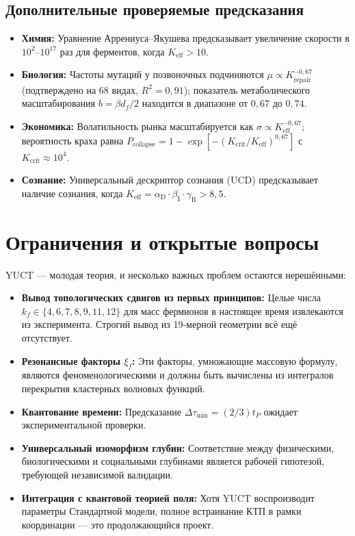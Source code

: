 \documentclass[11pt]{article}
\theoremstyle{remark}
\newcommand{\Keff}{K_{\mathrm{eff}}}
\newcommand{\alD}{\alpha_{\mathrm{D}}}
\newcommand{\beI}{\beta_{\mathrm{I}}}
\newcommand{\gaR}{\gamma_{\mathrm{R}}}
\begin{document}
	\subsection{Дополнительные проверяемые предсказания}
	
	\begin{itemize}
		\item \textbf{Химия:} Уравнение Аррениуса–Якушева предсказывает увеличение скорости в \(10^2\)–\(10^{17}\) раз для ферментов, когда \(\Keff > 10\).
		\item \textbf{Биология:} Частоты мутаций у позвоночных подчиняются \(\mu \propto K_{\text{repair}}^{-0,67}\) (подтверждено на 68 видах, \(R^2=0,91\)); показатель метаболического масштабирования \(b = \beta d_f/2\) находится в диапазоне от \(0,67\) до \(0,74\).
		\item \textbf{Экономика:} Волатильность рынка масштабируется как \(\sigma \propto \Keff^{-0,67}\); вероятность краха равна \(P_{\text{collapse}} = 1 - \exp[-(K_{\text{crit}}/\Keff)^{0,67}]\) с \(K_{\text{crit}} \approx 10^4\).
		\item \textbf{Сознание:} Универсальный дескриптор сознания (UCD) предсказывает наличие сознания, когда \(\Keff = \alD \cdot \beI \cdot \gaR > 8,5\).
	\end{itemize}
	
	\section{Ограничения и открытые вопросы}
	\label{sec:limitations}
	
	YUCT — молодая теория, и несколько важных проблем остаются нерешёнными:
	\begin{itemize}
		\item \textbf{Вывод топологических сдвигов из первых принципов:} Целые числа \(k_f \in \{4,6,7,8,9,11,12\}\) для масс фермионов в настоящее время извлекаются из эксперимента. Строгий вывод из 19-мерной геометрии всё ещё отсутствует.
		\item \textbf{Резонансные факторы \(\xi_f\):} Эти факторы, умножающие массовую формулу, являются феноменологическими и должны быть вычислены из интегралов перекрытия кластерных волновых функций.
		\item \textbf{Квантование времени:} Предсказание \(\Delta\tau_{\min} = (2/3) t_P\) ожидает экспериментальной проверки.
		\item \textbf{Универсальный изоморфизм глубин:} Соответствие между физическими, биологическими и социальными глубинами является рабочей гипотезой, требующей независимой валидации.
		\item \textbf{Интеграция с квантовой теорией поля:} Хотя YUCT воспроизводит параметры Стандартной модели, полное встраивание КТП в рамки координации — это продолжающийся проект.
	\end{itemize}
	
\end{document}
